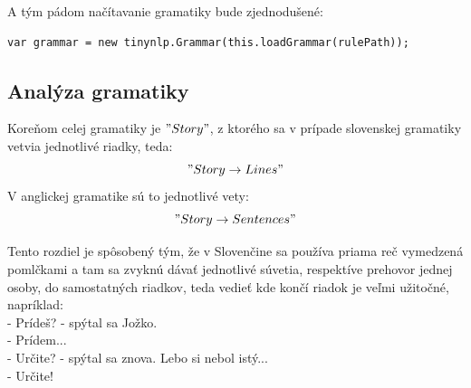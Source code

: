 \documentclass[12pt,a4paper]{report}
\theoremstyle{definition}
\theoremstyle{remark}
\begin{document}
A tým pádom načítavanie gramatiky bude zjednodušené: \\

\begin{lstlisting}[style=htmlcssjs]
var grammar = new tinynlp.Grammar(this.loadGrammar(rulePath));
\end{lstlisting}

\subsection{Analýza gramatiky}

Koreňom celej gramatiky je $"Story"$, z ktorého sa v prípade slovenskej gramatiky vetvia jednotlivé riadky, teda: $$"Story \to Lines "$$  V anglickej gramatike sú to jednotlivé vety: $$"Story \to Sentences "$$

Tento rozdiel je spôsobený tým, že v Slovenčine sa používa priama reč vymedzená pomlčkami a tam sa zvyknú dávať jednotlivé súvetia, respektíve prehovor jednej osoby, do samostatných riadkov, teda vedieť kde končí riadok je veľmi užitočné, napríklad: \\

\noindent - Prídeš? - spýtal sa Jožko.\\
- Prídem...\\
- Určite? - spýtal sa znova. Lebo si nebol istý...\\
- Určite! \\
\end{document}
